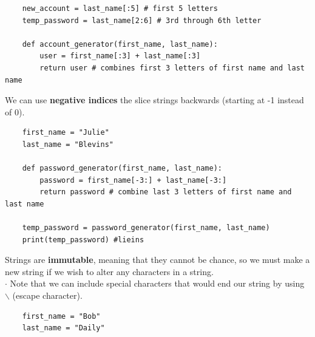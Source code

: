 \documentclass[11pt, a4paper]{article}
\begin{document}
\begin{spacing}{1.1}
\begin{lstlisting}
	new_account = last_name[:5] # first 5 letters
	temp_password = last_name[2:6] # 3rd through 6th letter 
	
	def account_generator(first_name, last_name):
		user = first_name[:3] + last_name[:3]
		return user # combines first 3 letters of first name and last name \end{lstlisting} \newpage
	\noindent We can use \textbf{negative indices} the slice strings backwards (starting at -1 instead of 0). 
	\begin{lstlisting}
	first_name = "Julie"
	last_name = "Blevins"
	
	def password_generator(first_name, last_name):
		password = first_name[-3:] + last_name[-3:]
		return password # combine last 3 letters of first name and last name
	
	temp_password = password_generator(first_name, last_name)
	print(temp_password) #lieins \end{lstlisting}\vspace*{1mm}
	Strings are \textbf{immutable}, meaning that they cannot be chance, so we must make a new string if we wish to alter any characters in a string. \\
	\hspace*{1.5mm} $\cdot$ Note that we can include special characters that would end our string by using $\backslash$ (escape character).
	\begin{lstlisting}
	first_name = "Bob"
	last_name = "Daily"
	

\end{lstlisting}
\end{spacing}
\end{document}
